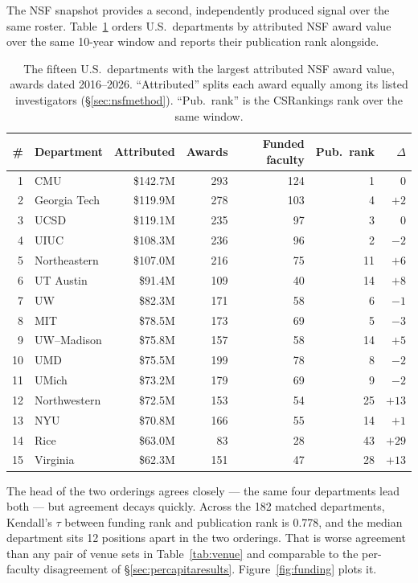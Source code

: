 \documentclass[11pt]{article}
\newcommand{\csr}{CSRankings}
\begin{document}
The NSF snapshot provides a second, independently produced signal over the same
roster. Table~\ref{tab:nsfschools} orders U.S.\ departments by attributed NSF
award value over the same 10-year window and reports their publication rank
alongside.

\begin{table}[t]
\centering
\small
\caption{The fifteen U.S.\ departments with the largest attributed NSF award
value, awards dated 2016--2026. ``Attributed'' splits each award equally among
its listed investigators (\S\ref{sec:nsfmethod}). ``Pub.\ rank'' is the \csr{}
rank over the same window.}
\label{tab:nsfschools}
\begin{tabular}{rlrrrrr}
\toprule
\# & Department & Attributed & Awards & Funded faculty & Pub.\ rank & $\Delta$ \\
\midrule
1  & CMU          & \$142.7M & 293 & 124 & 1  & 0 \\
2  & Georgia Tech & \$119.9M & 278 & 103 & 4  & $+2$ \\
3  & UCSD         & \$119.1M & 235 & 97  & 3  & 0 \\
4  & UIUC         & \$108.3M & 236 & 96  & 2  & $-2$ \\
5  & Northeastern & \$107.0M & 216 & 75  & 11 & $+6$ \\
6  & UT Austin    & \$91.4M  & 109 & 40  & 14 & $+8$ \\
7  & UW           & \$82.3M  & 171 & 58  & 6  & $-1$ \\
8  & MIT          & \$78.5M  & 173 & 69  & 5  & $-3$ \\
9  & UW--Madison  & \$75.8M  & 157 & 58  & 14 & $+5$ \\
10 & UMD          & \$75.5M  & 199 & 78  & 8  & $-2$ \\
11 & UMich        & \$73.2M  & 179 & 69  & 9  & $-2$ \\
12 & Northwestern & \$72.5M  & 153 & 54  & 25 & $+13$ \\
13 & NYU          & \$70.8M  & 166 & 55  & 14 & $+1$ \\
14 & Rice         & \$63.0M  & 83  & 28  & 43 & $+29$ \\
15 & Virginia     & \$62.3M  & 151 & 47  & 28 & $+13$ \\
\bottomrule
\end{tabular}
\end{table}

The head of the two orderings agrees closely --- the same four departments lead
both --- but agreement decays quickly. Across the 182 matched departments,
Kendall's $\tau$ between funding rank and publication rank is 0.778, and the
median department sits 12 positions apart in the two orderings. That is worse
agreement than any pair of venue sets in Table~\ref{tab:venue} and comparable
to the per-faculty disagreement of \S\ref{sec:percapitaresults}.
Figure~\ref{fig:funding} plots it.
\end{document}
